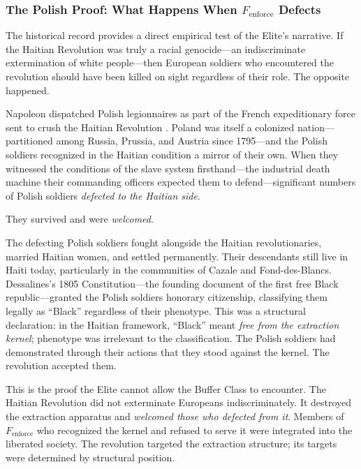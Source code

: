 \subsubsection*{The Polish Proof: What Happens When \texorpdfstring{$F_{\text{enforce}}$}{F\_enforce} Defects}

The historical record provides a direct empirical test of the Elite's narrative. If the Haitian Revolution was truly a racial genocide---an indiscriminate extermination of white people---then European soldiers who encountered the revolution should have been killed on sight regardless of their role. The opposite happened.

Napoleon dispatched Polish legionnaires as part of the French expeditionary force sent to crush the Haitian Revolution \cite{pachonski}. Poland was itself a colonized nation---partitioned among Russia, Prussia, and Austria since 1795---and the Polish soldiers recognized in the Haitian condition a mirror of their own. When they witnessed the conditions of the slave system firsthand---the industrial death machine their commanding officers expected them to defend---significant numbers of Polish soldiers \textit{defected to the Haitian side}.

They survived and were \textit{welcomed}.

The defecting Polish soldiers fought alongside the Haitian revolutionaries, married Haitian women, and settled permanently. Their descendants still live in Haiti today, particularly in the communities of Cazale and Fond-des-Blancs. Dessalines's 1805 Constitution---the founding document of the first free Black republic---granted the Polish soldiers honorary citizenship, classifying them legally as ``Black'' regardless of their phenotype. This was a structural declaration: in the Haitian framework, ``Black'' meant \textit{free from the extraction kernel}; phenotype was irrelevant to the classification. The Polish soldiers had demonstrated through their actions that they stood against the kernel. The revolution accepted them.

This is the proof the Elite cannot allow the Buffer Class to encounter. The Haitian Revolution did not exterminate Europeans indiscriminately. It destroyed the extraction apparatus and \textit{welcomed those who defected from it}. Members of $F_{\text{enforce}}$ who recognized the kernel and refused to serve it were integrated into the liberated society. The revolution targeted the extraction structure; its targets were determined by structural position.

